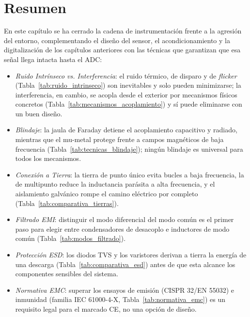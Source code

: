 
\section{Resumen}\label{sec:resumen_ruido}

En este capítulo se ha cerrado la cadena de instrumentación frente a la agresión del entorno, complementando el diseño del sensor, el acondicionamiento y la digitalización de los capítulos anteriores con las técnicas que garantizan que esa señal llega intacta hasta el ADC:

\begin{itemize}
    \item \emph{Ruido Intrínseco vs. Interferencia}: el ruido térmico, de disparo y de \textit{flicker} (Tabla~\ref{tab:ruido_intrinseco}) son inevitables y solo pueden minimizarse; la interferencia, en cambio, se acopla desde el exterior por mecanismos físicos concretos (Tabla~\ref{tab:mecanismos_acoplamiento}) y sí puede eliminarse con un buen diseño.
    \item \emph{Blindaje}: la jaula de Faraday detiene el acoplamiento capacitivo y radiado, mientras que el mu-metal protege frente a campos magnéticos de baja frecuencia (Tabla~\ref{tab:tecnicas_blindaje}); ningún blindaje es universal para todos los mecanismos.
    \item \emph{Conexión a Tierra}: la tierra de punto único evita bucles a baja frecuencia, la de multipunto reduce la inductancia parásita a alta frecuencia, y el aislamiento galvánico rompe el camino eléctrico por completo (Tabla~\ref{tab:comparativa_tierras}).
    \item \emph{Filtrado EMI}: distinguir el modo diferencial del modo común es el primer paso para elegir entre condensadores de desacoplo e inductores de modo común (Tabla~\ref{tab:modos_filtrado}).
    \item \emph{Protección ESD}: los diodos TVS y los varistores derivan a tierra la energía de una descarga (Tabla~\ref{tab:comparativa_esd}) antes de que esta alcance los componentes sensibles del sistema.
    \item \emph{Normativa EMC}: superar los ensayos de emisión (CISPR 32/EN 55032) e inmunidad (familia IEC 61000-4-X, Tabla~\ref{tab:normativa_emc}) es un requisito legal para el marcado CE, no una opción de diseño.
\end{itemize}

